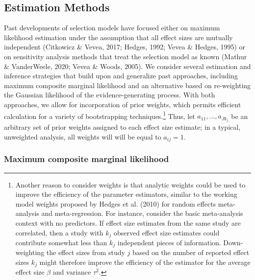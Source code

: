 \documentclass[
  american,
  man, donotrepeattitle,floatsintext]{apa7}
\begin{document}
\subsection{Estimation Methods}\label{estimation-methods}

Past developments of selection models have focused either on maximum likelihood estimation under the assumption that all effect sizes are mutually independent (Citkowicz \& Vevea, 2017; Hedges, 1992; Vevea \& Hedges, 1995) or on sensitivity analysis methods that treat the selection model as known (Mathur \& VanderWeele, 2020; Vevea \& Woods, 2005). We consider several estimation and inference strategies that build upon and generalize past approaches, including maximum composite marginal likelihood and an alternative based on re-weighting the Gaussian likelihood of the evidence-generating process.
With both approaches, we allow for incorporation of prior weights, which permits efficient calculation for a variety of bootstrapping techniques.\footnote{Another reason to consider weights is that analytic weights could be used to improve the efficiency of the parameter estimators, similar to the working model weights proposed by Hedges et al. (2010) for random effects meta-analysis and meta-regression. For instance, consider the basic meta-analysis context with no predictors. If effect size estimates from the same study are correlated, then a study with \(k_j\) observed effect size estimates could contribute somewhat less than \(k_j\) independent pieces of information. Down-weighting the effect sizes from study \(j\) based on the number of reported effect sizes \(k_j\) might therefore improve the efficiency of the estimator for the average effect size \(\beta\) and variance \(\tau^2\).}
Thus, let \(a_{11},...,a_{J k_j}\) be an arbitrary set of prior weights assigned to each effect size estimate; in a typical, unweighted analysis, all weights will will be equal to \(a_{ij} = 1\).

\subsubsection{Maximum composite marginal likelihood}\label{maximum-composite-marginal-likelihood}
\end{document}
